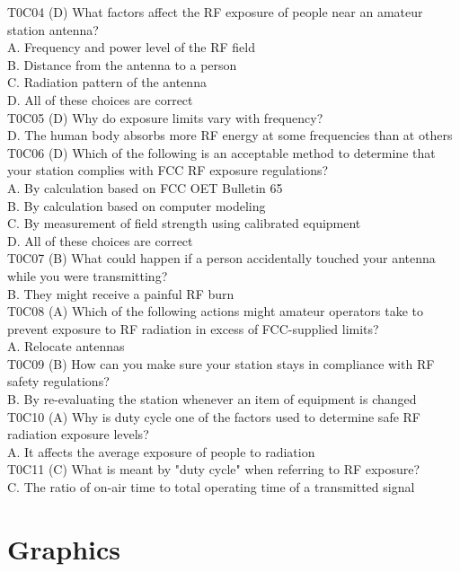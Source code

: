 \documentclass[12pt,letterpaper]{report}
\begin{document}
T0C04 (D) What factors affect the RF exposure of people near an amateur station antenna?\\
A. Frequency and power level of the RF field\\
B. Distance from the antenna to a person\\
C. Radiation pattern of the antenna\\
D. All of these choices are correct\\

T0C05 (D) Why do exposure limits vary with frequency?\\
D. The human body absorbs more RF energy at some frequencies than at others\\

T0C06 (D) Which of the following is an acceptable method to determine that your station complies with FCC RF exposure regulations?\\
A. By calculation based on FCC OET Bulletin 65\\
B. By calculation based on computer modeling\\
C. By measurement of field strength using calibrated equipment\\
D. All of these choices are correct\\

T0C07 (B) What could happen if a person accidentally touched your antenna while you were transmitting?\\
B. They might receive a painful RF burn\\

T0C08 (A) Which of the following actions might amateur operators take to prevent exposure to RF radiation in excess of FCC-supplied limits?\\
A. Relocate antennas\\

T0C09 (B) How can you make sure your station stays in compliance with RF safety regulations?\\
B. By re-evaluating the station whenever an item of equipment is changed\\

T0C10 (A) Why is duty cycle one of the factors used to determine safe RF radiation exposure levels?\\
A. It affects the average exposure of people to radiation\\

T0C11 (C) What is meant by "duty cycle" when referring to RF exposure?\\
C. The ratio of on-air time to total operating time of a transmitted signal\\
\chapter{Graphics}

\end{document}
